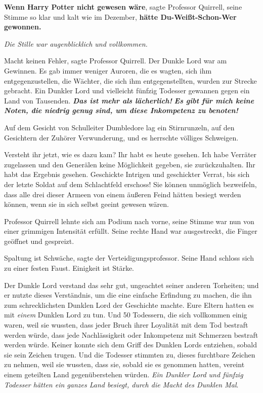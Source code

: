 \glqq{}\textbf{Wenn Harry Potter nicht gewesen wäre}\grqq{}, sagte Professor
Quirrell, seine Stimme so klar und kalt wie im Dezember, \glqq{}\textbf{hätte
Du-Weißt-Schon-Wer gewonnen.}\grqq{}

\emph{Die Stille war augenblicklich und vollkommen.}

\glqq{}Macht keinen Fehler\grqq{}, sagte Professor Quirrell. \glqq{}Der Dunkle
Lord war am Gewinnen. Es gab immer weniger Auroren, die es wagten, sich ihm
entgegenzustellen, die Wächter, die sich ihm entgegenstellten, wurden zur
Strecke gebracht. Ein Dunkler Lord und vielleicht fünfzig Todesser gewannen
gegen ein Land von Tausenden. \textbf{\emph{Das ist mehr als lächerlich!}}
\textbf{\emph{Es gibt für mich keine Noten, die niedrig genug sind, um diese
Inkompetenz zu benoten!}}\grqq{}

Auf dem Gesicht von Schulleiter Dumbledore lag ein Stirnrunzeln, auf den
Gesichtern der Zuhörer Verwunderung, und es herrschte völliges Schweigen.

\glqq{}Versteht ihr jetzt, wie es dazu kam? Ihr habt es heute gesehen. Ich habe
Verräter zugelassen und den Generälen keine Möglichkeit gegeben, sie
zurückzuhalten. Ihr habt das Ergebnis gesehen. Geschickte Intrigen und
geschickter Verrat, bis sich der letzte Soldat auf dem Schlachtfeld erschoss!
Sie können unmöglich bezweifeln, dass alle drei dieser Armeen von einem äußeren
Feind hätten besiegt werden können, wenn sie in sich selbst geeint gewesen
wären.\grqq{}

Professor Quirrell lehnte sich am Podium nach vorne, seine Stimme war nun von
einer grimmigen Intensität erfüllt. Seine rechte Hand war ausgestreckt, die
Finger geöffnet und gespreizt.

\glqq{}Spaltung ist Schwäche\grqq{}, sagte der Verteidigungsprofessor. Seine Hand
schloss sich zu einer festen Faust. \glqq{}Einigkeit ist Stärke.

Der Dunkle Lord verstand das sehr gut, ungeachtet seiner anderen Torheiten; und
er nutzte dieses Verständnis, um die eine einfache Erfindung zu machen, die ihn
zum schrecklichsten Dunklen Lord der Geschichte machte. Eure Eltern hatten es
mit \emph{einem} Dunklen Lord zu tun. Und 50 Todessern, die sich vollkommen
einig waren, weil sie wussten, dass jeder Bruch ihrer Loyalität mit dem Tod
bestraft werden würde, dass jede Nachlässigkeit oder Inkompetenz mit Schmerzen
bestraft werden würde. Keiner konnte sich dem Griff des Dunklen Lords entziehen,
sobald sie sein Zeichen trugen. Und die Todesser stimmten zu, dieses furchtbare
Zeichen zu nehmen, weil sie wussten, dass sie, sobald sie es genommen hatten,
vereint einem geteilten Land gegenüberstehen würden. \emph{Ein Dunkler Lord und
fünfzig Todesser hätten ein ganzes Land besiegt, durch die Macht des Dunklen
Mal}.\grqq{}

